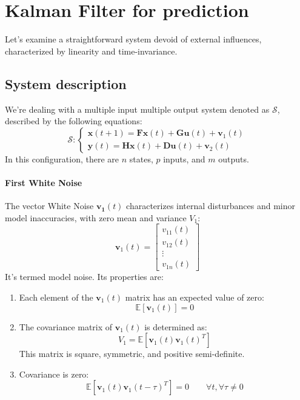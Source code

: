 \section{Kalman Filter for prediction}

Let's examine a straightforward system devoid of external influences, characterized by linearity and time-invariance.

\subsection{System description}
We're dealing with a multiple input multiple output system denoted as $\mathcal{S}$, described by the following equations:
\[\mathcal{S}:\begin{cases}
    \mathbf{x}(t+1)=\mathbf{Fx}(t)+\mathbf{Gu}(t)+\mathbf{v}_1(t) \\
    \mathbf{y}(t)=\mathbf{Hx}(t)+\mathbf{Du}(t)+\mathbf{v}_2(t)
\end{cases}\]
In this configuration, there are $n$ states, $p$ inputs, and $m$ outputs. 

\paragraph*{First White Noise}
The vector White Noise $\mathbf{v_1}(t)$ characterizes internal disturbances and minor model inaccuracies, with zero mean and variance $V_1$:
\[\mathbf{v}_1(t)=\begin{bmatrix} v_{11}(t) \\ v_{12}(t) \\ \vdots \\ v_{1n}(t) \end{bmatrix}\]
It's termed model noise. 
Its properties are:
\begin{enumerate}
    \item Each element of the $\mathbf{v}_1(t)$ matrix has an expected value of zero:
        \[\mathbb{E}\left[\mathbf{v}_1(t)\right]=0\]
    \item The covariance matrix of $\mathbf{v}_1(t)$ is determined as:
        \[V_1=\mathbb{E}\left[\mathbf{v}_1(t)\mathbf{v}_1(t)^T\right]\]
        This matrix is square, symmetric, and positive semi-definite.
    \item Covariance is zero:
        \[\mathbb{E}\left[\mathbf{v}_1(t)\mathbf{v}_1(t-\tau)^T\right]=0\qquad \forall t, \forall\tau\neq 0\]
\end{enumerate}

